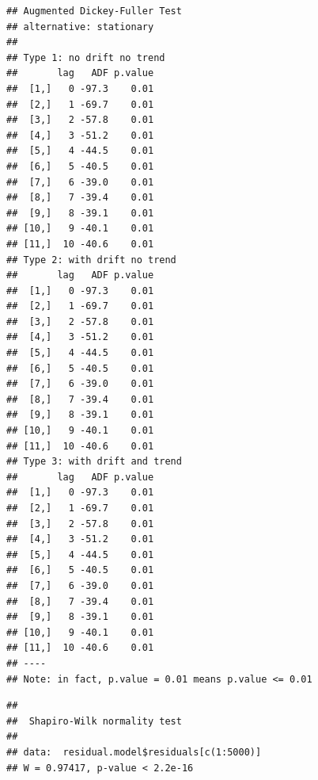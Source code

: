 \documentclass[
]{article}
\newenvironment{Shaded}{\begin{snugshade}}{\end{snugshade}}
\newcommand{\DecValTok}[1]{\textcolor[rgb]{0.00,0.00,0.81}{#1}}
\newcommand{\FunctionTok}[1]{\textcolor[rgb]{0.00,0.00,0.00}{#1}}
\newcommand{\NormalTok}[1]{#1}
\newcommand{\SpecialCharTok}[1]{\textcolor[rgb]{0.00,0.00,0.00}{#1}}
\begin{document}
\begin{verbatim}
## Augmented Dickey-Fuller Test 
## alternative: stationary 
##  
## Type 1: no drift no trend 
##       lag   ADF p.value
##  [1,]   0 -97.3    0.01
##  [2,]   1 -69.7    0.01
##  [3,]   2 -57.8    0.01
##  [4,]   3 -51.2    0.01
##  [5,]   4 -44.5    0.01
##  [6,]   5 -40.5    0.01
##  [7,]   6 -39.0    0.01
##  [8,]   7 -39.4    0.01
##  [9,]   8 -39.1    0.01
## [10,]   9 -40.1    0.01
## [11,]  10 -40.6    0.01
## Type 2: with drift no trend 
##       lag   ADF p.value
##  [1,]   0 -97.3    0.01
##  [2,]   1 -69.7    0.01
##  [3,]   2 -57.8    0.01
##  [4,]   3 -51.2    0.01
##  [5,]   4 -44.5    0.01
##  [6,]   5 -40.5    0.01
##  [7,]   6 -39.0    0.01
##  [8,]   7 -39.4    0.01
##  [9,]   8 -39.1    0.01
## [10,]   9 -40.1    0.01
## [11,]  10 -40.6    0.01
## Type 3: with drift and trend 
##       lag   ADF p.value
##  [1,]   0 -97.3    0.01
##  [2,]   1 -69.7    0.01
##  [3,]   2 -57.8    0.01
##  [4,]   3 -51.2    0.01
##  [5,]   4 -44.5    0.01
##  [6,]   5 -40.5    0.01
##  [7,]   6 -39.0    0.01
##  [8,]   7 -39.4    0.01
##  [9,]   8 -39.1    0.01
## [10,]   9 -40.1    0.01
## [11,]  10 -40.6    0.01
## ---- 
## Note: in fact, p.value = 0.01 means p.value <= 0.01
\end{verbatim}

\begin{Shaded}
\end{Shaded}

\begin{verbatim}
## 
##  Shapiro-Wilk normality test
## 
## data:  residual.model$residuals[c(1:5000)]
## W = 0.97417, p-value < 2.2e-16
\end{verbatim}
\end{document}
